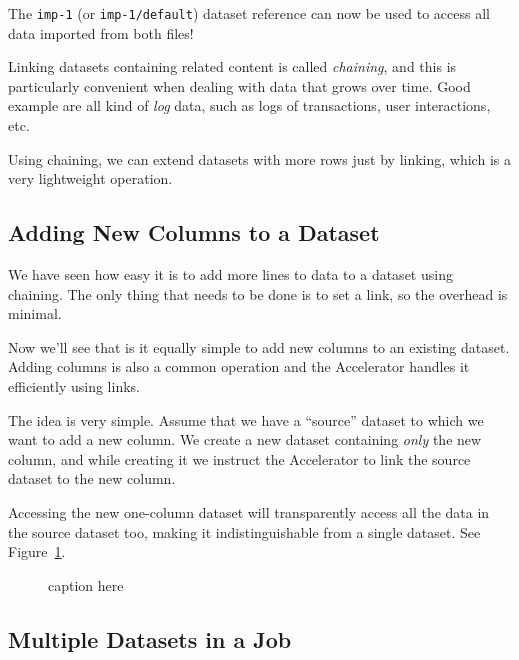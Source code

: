 \documentclass[a4paper]{article}
\begin{document}
\noindent The \texttt{imp-1} (or \texttt{imp-1/default}) dataset
reference can now be used to access all data imported from both files!

Linking datasets containing related content is called \emph{chaining},
and this is particularly convenient when dealing with data that grows
over time.  Good example are all kind of \emph{log} data, such as logs
of transactions, user interactions, etc.

Using chaining, we can extend datasets with more rows just by linking,
which is a very lightweight operation.

\clearpage





\subsection{Adding New Columns to a Dataset}
We have seen how easy it is to add more lines to data to a dataset
using chaining.  The only thing that needs to be done is to set a
link, so the overhead is minimal.

Now we'll see that is it equally simple to add new columns to an
existing dataset.  Adding columns is also a common operation and the
Accelerator handles it efficiently using links.

The idea is very simple.  Assume that we have a ``source'' dataset to
which we want to add a new column.  We create a new dataset containing
\textsl{only} the new column, and while creating it we instruct the
Accelerator to link the source dataset to the new column.

Accessing the new one-column dataset will transparently access all the
data in the source dataset too, making it indistinguishable from a
single dataset.  See Figure~\ref{fig:dep_dataset_append_column}.

\begin{figure}[h!]
  \begin{center}
    
    \caption{caption here}
    \label{fig:dep_dataset_append_column}
  \end{center}
\end{figure}

\clearpage




\subsection{Multiple Datasets in a Job}
\end{document}
